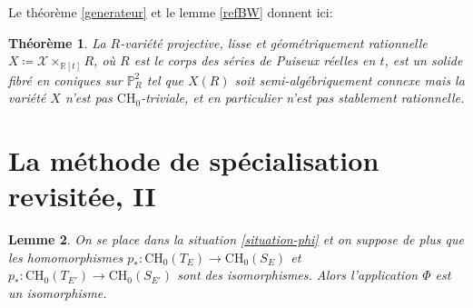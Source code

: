 \documentclass[JEP,XML,SOM,Unicode,francais,published]{cedram}
\newcommand{\CH}{\mathrm{CH}}
\newtheorem{thm}{Théorème}[section]
\newtheorem{lemma}[thm]{Lemme}
\theoremstyle{definition}
\newcommand{\R}{\mathbb R}
\renewcommand{\P}{\mathbb P}
\newcommand{\mc}[1]{\mathcal{#1}}
\begin{document}
Le théorème \ref{generateur} et le lemme \ref{refBW} donnent ici:

\begin{thm}\label{prop-fibres-coniques}
La $R$-variété projective, lisse et géométriquement rationnelle
$X\coloneqq \mc{X}\times_{\R[t]}R$, où $R$ est le corps des séries de Puiseux réelles en $t$, est un solide fibré en coniques sur $\P^2_R$ tel que $X(R)$ soit semi-algébriquement connexe mais la variété $X$ n'est pas $\CH_0$-triviale, et en particulier n'est pas stablement rationnelle.
\end{thm}

\section{La méthode de spécialisation revisitée, II}\label{methode-2}

\begin{lemma}\label{lemme-phi-isomorphisme-variante}
On se place dans la situation \ref{situation-phi} et on suppose de plus que les homomorphismes $p_*\colon \CH_0(T_{E})\to \CH_0(S_{E})$ et $p_*\colon \CH_0(T_{E'})\to \CH_0(S_{E'})$ sont des isomorphismes. Alors l'application $\Phi$ est un isomorphisme.
\end{lemma}
\end{document}
